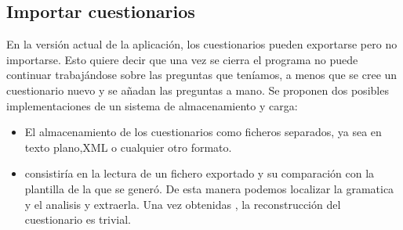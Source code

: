  \subsection{Importar cuestionarios} 
 En la versión actual de la aplicación, los cuestionarios pueden exportarse pero no importarse. Esto quiere decir que una vez se cierra el programa no puede continuar trabajándose sobre las preguntas que teníamos, a menos que se cree un cuestionario nuevo y se añadan las preguntas a mano. Se proponen dos posibles implementaciones de  un sistema de  almacenamiento y carga:
 \begin{itemize}
 \item El almacenamiento de los cuestionarios como ficheros separados, ya sea en texto plano,XML o cualquier otro formato.
 \item consistiría en la lectura de un fichero exportado y su comparación con la plantilla de la que se generó. De esta manera podemos localizar la gramatica y el analisis y extraerla. Una vez obtenidas , la reconstrucción del cuestionario es trivial.
 \end{itemize}

